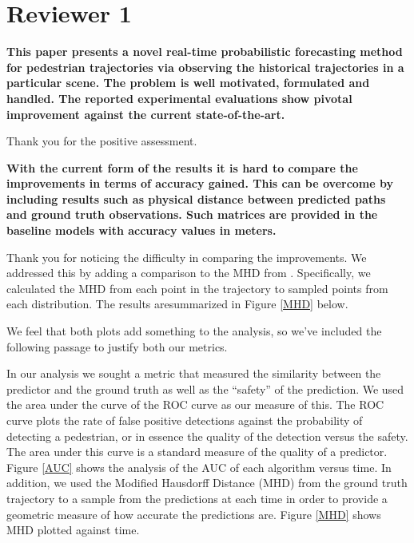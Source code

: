 \documentclass[usenames,dvipsnames]{article}
\providecommand{\response}[1]{
\noindent
\noindent\colorbox{gray!20}{
\parbox{\textwidth}{
\setlength{\parskip}{.1in}
\setlength{\parindent}{.1in}
#1}
}
}
\begin{document}
\section*{Reviewer 1}
\begin{enumerate}

\begin{item}
\textbf{This paper presents a novel real-time probabilistic forecasting method
for pedestrian trajectories via observing the historical trajectories
in a particular scene. The problem is well motivated, formulated and
handled. The reported experimental evaluations show pivotal improvement
against the current state-of-the-art.} 

Thank you for the positive assessment.
\end{item}

\begin{item}
\textbf{With the current form of the results it is hard to compare the
improvements in terms of accuracy gained. This can be overcome by
including results such as physical distance between predicted paths and
ground truth observations. Such matrices are provided in the baseline
models \cite{Kitani2012} \cite{Karasev2016} \cite{Robicquet2016} with accuracy values in meters. }

Thank you for noticing the difficulty in comparing the improvements. We addressed this by adding a comparison to the MHD from . Specifically, we calculated the MHD from each point in the trajectory to sampled points from each distribution. The results aresummarized in Figure \ref{MHD} below. 

We feel that both plots add something to the analysis, so we've included the following passage to justify both our metrics.


\reversemarginpar{}
\response{ In our analysis we sought a metric that measured the similarity between the predictor and the ground truth as well as the ``safety'' of the prediction. We used the area under the curve of the ROC curve as our measure of this. The ROC curve plots the rate of false positive detections against the probability of detecting a pedestrian, or in essence the quality of the detection versus the safety. The area under this curve is a standard measure of the quality of a predictor. Figure \ref{AUC} shows the analysis of the AUC of each algorithm versus time. In addition, we used the Modified Hausdorff Distance (MHD) from the ground truth trajectory to a sample from the predictions at each time in order to provide a geometric measure of how accurate the predictions are. Figure \ref{MHD} shows MHD plotted against time.}


\end{item}
\end{enumerate}
\end{document}
